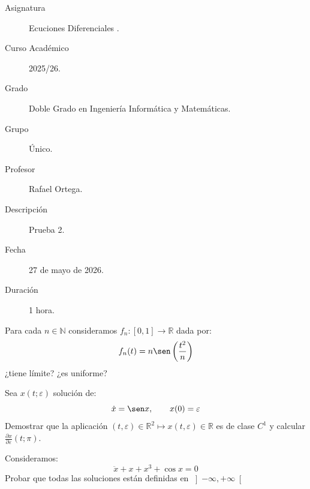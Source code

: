 \documentclass[12pt]{article}
\begin{document}

    
    

    \begin{description}
        \item[Asignatura] Ecuciones Diferenciales .
        \item[Curso Académico] 2025/26.
        \item[Grado] Doble Grado en Ingeniería Informática y Matemáticas.
        \item[Grupo] Único.
        \item[Profesor] Rafael Ortega.
        \item[Descripción] Prueba 2.
        \item[Fecha] 27 de mayo de 2026.
        \item[Duración] 1 hora.
    
    \end{description}
    \newpage


    
    \begin{ejercicio}
        Para cada $n\in \mathbb{N}$ consideramos $f_n:[0,1]\to\mathbb{R}$ dada por:
        \begin{equation*}
            f_n(t) = n\sen\left(\frac{t^2}{n}\right)
        \end{equation*}
        ¿tiene límite? ¿es uniforme?
    \end{ejercicio}

    \begin{ejercicio}
        Sea $x(t;\varepsilon)$ solución de:
        \begin{equation*}
            \dot{x} = \sen x, \qquad x(0) = \varepsilon
        \end{equation*}
        Demostrar que la aplicación $(t,\varepsilon)\in \mathbb{R}^2\longmapsto x(t,\varepsilon)\in \mathbb{R}$ es de clase $C^1$ y calcular $\frac{\partial x}{\partial \varepsilon}(t;\pi)$.
    \end{ejercicio}

    \begin{ejercicio}
        Consideramos:
        \begin{equation*}
            \ddot{x} + x + x^3 + \cos x = 0
        \end{equation*}
        Probar que todas las soluciones están definidas en $\left]-\infty,+\infty\right[$
    \end{ejercicio}
\end{document}
